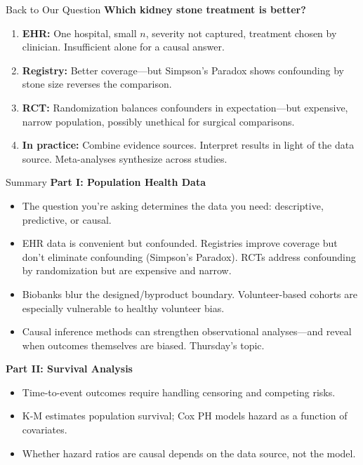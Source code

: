 \documentclass[aspectratio=169,10pt]{beamer}
\begin{document}
\begin{frame}{Back to Our Question}
\textbf{Which kidney stone treatment is better?}

\vspace{0.2em}
\pause
\begin{enumerate}[<+->]
    \item \textbf{EHR:} One hospital, small $n$, severity not captured, treatment chosen by clinician. Insufficient alone for a causal answer.
    \item \textbf{Registry:} Better coverage---but Simpson's Paradox shows confounding by stone size reverses the comparison.
    \item \textbf{RCT:} Randomization balances confounders in expectation---but expensive, narrow population, possibly unethical for surgical comparisons.
    \item \textbf{In practice:} Combine evidence sources. Interpret results in light of the data source. Meta-analyses synthesize across studies.
\end{enumerate}

\end{frame}

\begin{frame}{Summary}
\textbf{Part I: Population Health Data}
\begin{itemize}
    \item The question you're asking determines the data you need: descriptive, predictive, or causal.
    \item EHR data is convenient but confounded. Registries improve coverage but don't eliminate confounding (Simpson's Paradox). RCTs address confounding by randomization but are expensive and narrow.
    \item Biobanks blur the designed/byproduct boundary. Volunteer-based cohorts are especially vulnerable to healthy volunteer bias.
    \item Causal inference methods can strengthen observational analyses---and reveal when outcomes themselves are biased. Thursday's topic.
\end{itemize}

\vspace{0.2em}
\textbf{Part II: Survival Analysis}
\begin{itemize}
    \item Time-to-event outcomes require handling censoring and competing risks.
    \item K-M estimates population survival; Cox PH models hazard as a function of covariates.
    \item Whether hazard ratios are causal depends on the data source, not the model.
\end{itemize}
\end{frame}
\end{document}

